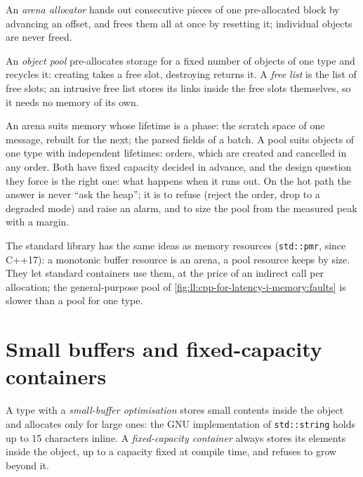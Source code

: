 \begin{definition}\label{def:ll:cpp-for-latency-i-memory:arena}
An \emph{arena allocator} hands out consecutive pieces of one pre-allocated block by advancing an
offset, and frees them all at once by resetting it; individual objects are never freed.
\end{definition}

\begin{definition}\label{def:ll:cpp-for-latency-i-memory:pool}
An \emph{object pool} pre-allocates storage for a fixed number of objects of one type and recycles it:
creating takes a free slot, destroying returns it. A \emph{free list} is the list of free slots; an
intrusive free list stores its links inside the free slots themselves, so it needs no memory of its own.
\end{definition}

An arena suits memory whose lifetime is a phase: the scratch space of one message, rebuilt for the next; the parsed fields
of a batch. A pool suits objects of one type with independent lifetimes: orders, which are created and cancelled in any
order. Both have fixed capacity decided in advance, and the design question they force is the right one: what happens when
it runs out. On the hot path the answer is never ``ask the heap''; it is to refuse (reject the order, drop to a degraded
mode) and raise an alarm, and to size the pool from the measured peak with a margin.

The standard library has the same ideas as memory resources (\texttt{std::pmr}, since C++17): a monotonic buffer resource
is an arena, a pool resource keeps  by size. They let standard containers use them, at the price of an indirect
call per allocation; the general-purpose pool of \cref{fig:ll:cpp-for-latency-i-memory:faults} is slower than a pool for one
type.

\section{Small buffers and fixed-capacity containers}

\begin{definition}\label{def:ll:cpp-for-latency-i-memory:sbo}
A type with a \emph{small-buffer optimisation} stores small contents inside the object and
allocates only for large ones: the GNU implementation of \texttt{std::string} holds up to 15 characters inline. A
\emph{fixed-capacity container} always stores its elements inside the object, up to a
capacity fixed at compile time, and refuses to grow beyond it.
\end{definition}

